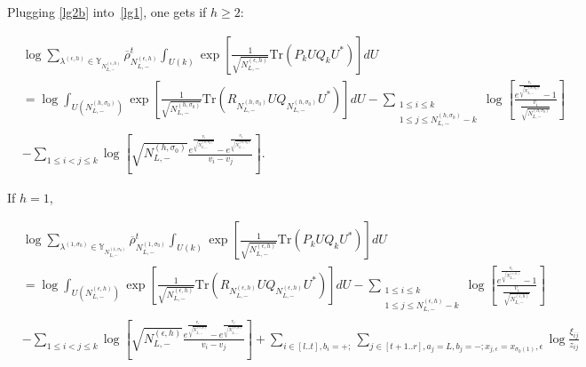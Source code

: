 \documentclass[11pt]{amsart}
\theoremstyle{plain}
\theoremstyle{definition}
\theoremstyle{remark}
\newcommand\ol{\overline}
\newcommand\si{\sigma}
\newcommand\YY{\mathbb{Y}}
\numberwithin{equation}{section}
\numberwithin{theorem}{section}
\numberwithin{figure}{section}
\begin{document}
Plugging \eqref{lg2b}
into~\eqref{lg1}, one gets if $h\geq 2$:
\begin{small}
\begin{align*}
&\log\sum_{\lambda^{(\epsilon,h)}\in \YY_{N_{L,-}^{(\epsilon,h)}}}
\ol{\rho}^t_{N_{L,-}^{(\epsilon,h)}}\int_{U(k)} 
\exp\left[\frac{1}{\sqrt{N_{L,-}^{(\epsilon,h)}}}\mathrm{Tr}\left(P_kUQ_kU^*\right)\right]dU\\
&=\log\int_{U(N_{L,-}^{(h,\si_0)})}\exp\left[\frac{1}{\sqrt{N_{L,-}^{(h,\si_0)}}}\mathrm{Tr}\left(R_{N_{L,-}^{(h,\si_0)}}UQ_{N_{L,-}^{(h,\si_0)}}U^*\right)\right]dU-\sum_{\substack{{1\leq i\leq k}\\{1\leq j\leq N_{L,-}^{(h,\si_0)}-k}}}
\log\left[
  \frac{e^{\frac{v_i}{\sqrt{N_{L,-}^{(h,\si_0)}}}}-1}{\frac{v_i}{\sqrt{N_{L,-}^{(h,\si_0)}}}}
\right]
\\
&-\sum_{1\leq i<j\leq k}
\log\left[
  \sqrt{N_{L,-}^{(h,\si_0)}}\frac{e^{\frac{v_i}{\sqrt{N_{L,-}^{(h,\si_0)}}}}-e^{\frac{v_j}{\sqrt{N_{L,-}^{(h,\si_0)}}}}}{v_i-v_j}
\right].
\end{align*}
\end{small}
If $h=1$,
\begin{small}
\begin{align*}
&\log\sum_{\lambda^{(1,\si_0)}\in \YY_{N_{L,-}^{(1,\si_0)}}}
\ol{\rho}^t_{N_{L,-}^{(1,\si_0)}}\int_{U(k)} 
\exp\left[\frac{1}{\sqrt{N_{L,-}^{(\epsilon,h)}}}\mathrm{Tr}\left(P_kUQ_kU^*\right)\right]dU\\
&=\log\int_{U(N_{L,-}^{(\epsilon,h)})}\exp\left[\frac{1}{\sqrt{N_{L,-}^{(\epsilon,h)}}}\mathrm{Tr}\left(R_{N_{L,-}^{(\epsilon,h)}}UQ_{N_{L,-}^{(\epsilon,h)}}U^*\right)\right]dU-\sum_{\substack{{1\leq i\leq k}\\{1\leq j\leq N_{L,-}^{(\epsilon,h)}-k}}}
\log\left[
  \frac{e^{\frac{v_i}{\sqrt{N_{L,-}^{(\epsilon,h)}}}}-1}{\frac{v_i}{\sqrt{N_{L,-}^{(\epsilon,h)}}}}
\right]
\\
&-\sum_{1\leq i<j\leq k}
\log\left[
  \sqrt{N_{L,-}^{(\epsilon,h)}}\frac{e^{\frac{v_i}{\sqrt{N_{L,-}^{(\epsilon,h)}}}}-e^{\frac{v_j}{\sqrt{N_{L,-}^{(\epsilon,h)}}}}}{v_i-v_j}
\right]+\sum_{i\in[l..t],b_i=+;}\sum_{j\in[t+1..r],a_j=L,b_j=-;x_{j,\epsilon}=x_{\si_0(1)},\epsilon}\log\frac{\xi_{ij}}{z_{ij}}
\end{align*}
\end{small}
\end{document}
